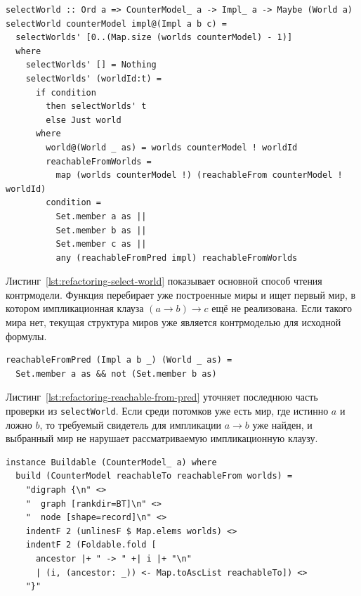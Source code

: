 \documentclass[14pt, russian]{scrartcl}
\begin{document}
\begin{listing}[!htb]
\caption{Поиск мира, нарушающего импликационную клаузу \texttt{selectWorld}}
\label{lst:refactoring-select-world}
\begin{verbatim}
selectWorld :: Ord a => CounterModel_ a -> Impl_ a -> Maybe (World a)
selectWorld counterModel impl@(Impl a b c) =
  selectWorlds' [0..(Map.size (worlds counterModel) - 1)]
  where
    selectWorlds' [] = Nothing
    selectWorlds' (worldId:t) =
      if condition
        then selectWorlds' t
        else Just world
      where
        world@(World _ as) = worlds counterModel ! worldId
        reachableFromWorlds =
          map (worlds counterModel !) (reachableFrom counterModel ! worldId)
        condition =
          Set.member a as ||
          Set.member b as ||
          Set.member c as ||
          any (reachableFromPred impl) reachableFromWorlds
\end{verbatim}
\end{listing}

Листинг~\ref{lst:refactoring-select-world} показывает основной способ чтения
контрмодели. Функция перебирает уже построенные миры и ищет первый мир, в
котором импликационная клауза $(a \rightarrow b) \rightarrow c$ ещё не
реализована. Если такого мира нет, текущая структура миров уже является
контрмоделью для исходной формулы.

\begin{listing}[!htb]
\caption{Предикат для потомков выбранного мира}
\label{lst:refactoring-reachable-from-pred}
\begin{verbatim}
reachableFromPred (Impl a b _) (World _ as) =
  Set.member a as && not (Set.member b as)
\end{verbatim}
\end{listing}

Листинг~\ref{lst:refactoring-reachable-from-pred} уточняет последнюю часть
проверки из \texttt{selectWorld}. Если среди потомков уже есть мир, где истинно
$a$ и ложно $b$, то требуемый свидетель для импликации $a \rightarrow b$ уже
найден, и выбранный мир не нарушает рассматриваемую импликационную клаузу.

\begin{listing}[!htb]
\caption{Вывод контрмодели в формате DOT}
\label{lst:refactoring-countermodel-build}
\begin{verbatim}
instance Buildable (CounterModel_ a) where
  build (CounterModel reachableTo reachableFrom worlds) = 
    "digraph {\n" <>
    "  graph [rankdir=BT]\n" <>
    "  node [shape=record]\n" <>
    indentF 2 (unlinesF $ Map.elems worlds) <>
    indentF 2 (Foldable.fold [
      ancestor |+ " -> " +| i |+ "\n"
      | (i, (ancestor: _)) <- Map.toAscList reachableTo]) <>
    "}"
\end{verbatim}
\end{listing}
\end{document}
